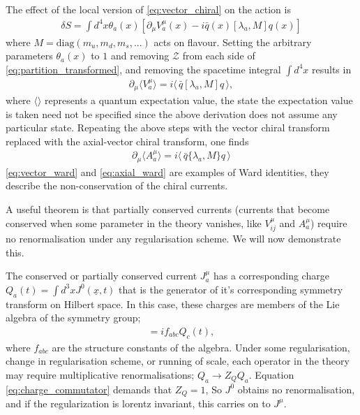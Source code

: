The effect of the local version of \eqref{eq:vector_chiral} on the action is
\begin{align}
  \delta S = \int d^4x \theta_a(x) \left[ \partial_{\mu} V_a^{\mu}(x) - i\bar{q}(x) [\lambda_a,M] q(x) \right]
\end{align}
where $M = \text{diag}(m_u,m_d,m_s,...)$ acts on flavour. Setting the arbitrary parameters $\theta_a(x)$ to $1$ and removing $\mathcal{Z}$ from each side of \eqref{eq:partition_transformed}, and removing the spacetime integral $\int d^4x$ results in
\begin{align}
  \partial_{\mu}\langle V_a^{\mu} \rangle = i \langle \, \bar{q} [ \lambda_a, M ] q \, \rangle,
  \label{eq:vector_ward}
\end{align}
where $\langle \rangle$ represents a quantum expectation value, the state the expectation value is taken need not be specified since the above derivation does not assume any particular state. Repeating the above steps with the vector chiral transform replaced with the axial-vector chiral transform, one finds
\begin{align}
  \partial_{\mu}\langle A_a^{\mu} \rangle = i \langle\, \bar{q} \{ \lambda_a,M \} q \,\rangle
  \label{eq:axial_ward}
\end{align}
\eqref{eq:vector_ward} and \eqref{eq:axial_ward} are examples of Ward identities, they describe the non-conservation of the chiral currents.

A useful theorem \cite{Fubini:1964boa} is that partially conserved currents (currents that become conserved when some parameter in the theory vanishes, like $V^{\mu}_{ij}$ and $A^{\mu}_a$) require no renormalisation under any regularisation scheme. We will now demonstrate this.

The conserved or partially conserved current $J_a^{\mu}$ has a corresponding charge $Q_a(t) = \int d^3x J^{0}(\underline{x},t)$ that is the generator of it's corresponding symmetry transform on Hilbert space. In this case, these charges are members of the Lie algebra of the symmetry group;
\begin{align}
  [ Q_a(t), Q_b(t) ] = if_{abc} Q_c(t),
  \label{eq:charge_commutator}
\end{align}
where $f_{abc}$ are the structure constants of the algebra. Under some regularisation, change in regularisation scheme, or running of scale, each operator in the theory may require multiplicative renormalisations; $Q_a \to Z_Q Q_a$. Equation \eqref{eq:charge_commutator} demands that $Z_Q=1$, So $J^0$ obtains no renormalisation, and if the regularization is lorentz invariant, this carries on to $J^{\mu}$.

